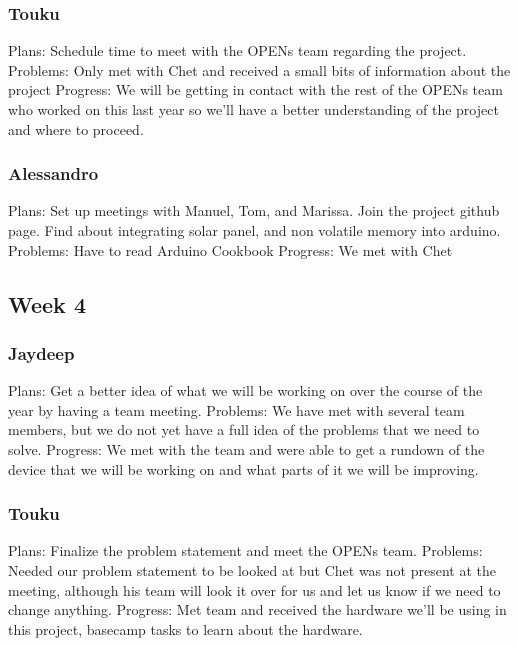 \documentclass[onecolumn, draftclsnofoot,10pt, compsoc]{IEEEtran}
\begin{document}
\subsubsection{Touku}
Plans: Schedule time to meet with the OPENs team regarding the project.
\newline
Problems: Only met with Chet and received a small bits of information about the project
\newline
Progress: We will be getting in contact with the rest of the OPENs team who worked on this last year so we’ll have a better understanding of the project and where to proceed.

\subsubsection{Alessandro}
Plans: Set up meetings with Manuel, Tom, and Marissa. Join the project github page. Find about integrating solar panel, and non volatile memory into arduino. 
\newline
Problems: Have to read Arduino Cookbook
\newline
Progress: We met with Chet

\subsection{Week 4}
\subsubsection{Jaydeep}
Plans: Get a better idea of what we will be working on over the course of the year by having a team meeting.
\newline
Problems: We have met with several team members, but we do not yet have a full idea of the problems that we need to solve. 
\newline
Progress:  We met with the team and were able to get a rundown of the device that we will be working on and what parts of it we will be improving. 

\subsubsection{Touku}
Plans: Finalize the problem statement and meet the OPENs team.
\newline
Problems: Needed our problem statement to be looked at but Chet was not present at the meeting, although his team will look it over for us and let us know if we need to change anything.
\newline
Progress: Met team and received the hardware we’ll be using in this project, basecamp tasks to learn about the hardware.
\end{document}
